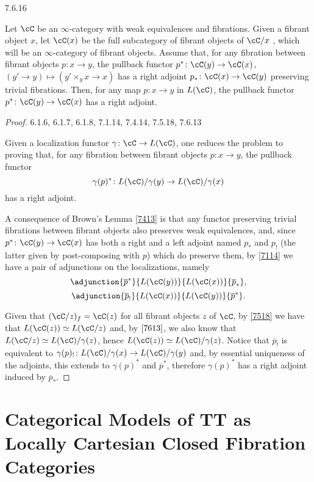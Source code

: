 \documentclass[a4paper,12pt]{scrartcl}
\begin{document}
\begin{thm}\label{7616}
  7.6.16

  Let $\cC$ be an $\infty$-category with weak equivalences and fibrations. Given
  a fibrant object $x$, let $\cC(x)$ be the full subcategory of fibrant objects
  of $\cC/x$ , which will be an $\infty$-category of
  fibrant objects. Assume that, for any fibration between fibrant objects
  $p\colon x\rightarrow y$, the pullback functor
  $p^*\colon\cC(y)\rightarrow\cC(x)$, $(y'\rightarrow y)\mapsto(y'\times_y
  x\rightarrow x)$ has a right adjoint $p_*\colon\cC(x)\rightarrow\cC(y)$
  preserving trivial fibrations. Then, for any map $p\colon x\rightarrow y$ in
  $L(\cC)$, the pullback functor $p^*\colon\cC(y)\rightarrow\cC(x)$ has a right
  adjoint.
\end{thm}
\begin{proof}
  6.1.6, 6.1.7, 6.1.8, 7.1.14, 7.4.14, 7.5.18, 7.6.13

  Given a localization functor $\gamma\colon\cC\rightarrow L(\cC)$, one reduces
  the problem to proving that, for any fibration between fibrant objects
  $p\colon x\rightarrow y$, the pullback functor
  \[\gamma(p)^*\colon L(\cC)/\gamma(y)\rightarrow L(\cC)/\gamma(x)\]
  has a right adjoint.

  A consequence of Brown's Lemma \ref{7413} is that any functor preserving
  trivial fibrations between fibrant objects also preserves weak equivalences,
  and, since $p^*\colon\cC(y)\rightarrow\cC(x)$ has both a right and a left
  adjoint named $p_*$ and $p_!$ (the latter given by post-composing with $p$)
  which do preserve them, by \ref{7114} we have a pair of adjunctions on the
  localizations, namely
  \[\adjunction{\overline{p}^*}{L(\cC(y))}{L(\cC(x))}{\overline{p}_*},\]
  \[\adjunction{\overline{p}_!}{L(\cC(x))}{L(\cC(y))}{\overline{p}^*}.\]

  Given that $(\cC/z)_f=\cC(z)$ for all fibrant objects $z$ of $\cC$, by
  \ref{7518} we have that $L(\cC(z))\simeq L(\cC/z)$ and, by $\ref{7613}$, we
  also know that $L(\cC/z)\simeq L(\cC)/\gamma(z)$, hence $L(\cC(z))\simeq
  L(\cC)/\gamma(z)$. Notice that $\overline{p}_!$ is equivalent to
  $\gamma(p)_!\colon L(\cC)/\gamma(x)\rightarrow L(\cC)/\gamma(y)$ and, by
  essential uniqueness of the adjoints, this extends to $\gamma(p)^*$ and
  $\overline{p}^*$, therefore $\gamma(p)^*$ has a right adjoint induced by
  $\overline{p}_*$.
\end{proof}

\section{Categorical Models of TT as Locally Cartesian Closed Fibration
Categories}
\end{document}
